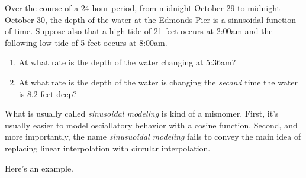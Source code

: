 \documentclass{ximera}
\begin{document}
\begin{question} \label{QIJDfmpeKK}
Over the course of a 24-hour period, from midnight October 29 to midnight October 30, the depth of the water at the Edmonds Pier is a sinusoidal function of time. Suppose also that a high tide of 21 feet occurs at 2:00am and the following low tide of 5 feet occurs at 8:00am. 

\begin{enumerate}
\item At what rate is the depth of the water changing at 5:36am?
\item At what rate is the depth of the water is changing the \emph{second} time the water is $8.2$ feet deep?
\end{enumerate}

\end{question}


What is usually called \emph{sinusoidal modeling} is kind of a misnomer. First, it's usually easier to model osciallatory behavior with a cosine function. Second, and more importantly, the name \emph{sinusuoidal modeling} fails to convey the main idea of replacing linear interpolation with circular interpolation.

Here's an example.
\end{document}
